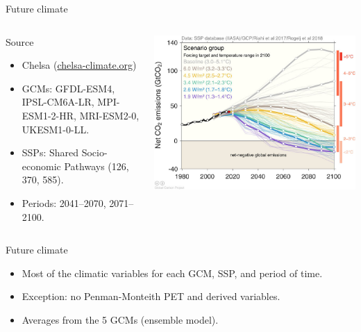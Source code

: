 \documentclass[10pt,table,dvipsnames,compress]{beamer}
\begin{document}
\begin{frame}[label={sec:org3bcafcc}]{Future climate}
\begin{columns}
\begin{column}{0.55\columnwidth}
\begin{block}{Source}
\begin{itemize}
\item Chelsa (\href{https://chelsa-climate.org)}{chelsa-climate.org})
\item GCMs: GFDL-ESM4, IPSL-CM6A-LR, MPI-ESM1-2-HR, MRI-ESM2-0, UKESM1-0-LL.
\item SSPs: Shared Socio-economic Pathways (126, 370, 585).
\item Periods: 2041--2070, 2071--2100.
\end{itemize}
\end{block}
\end{column}

\begin{column}{0.45\columnwidth}
\begin{center}
\includegraphics[width=\textwidth]{figs/SSPs.jpg}
\end{center}
\end{column}
\end{columns}

\begin{block}{Future climate}
\begin{itemize}
\item Most of the climatic variables for each GCM, SSP, and period of time.
\item Exception: no Penman-Monteith PET and derived variables.
\item Averages from the 5 GCMs (ensemble model).
\end{itemize}
\end{block}
\end{frame}
\end{document}
